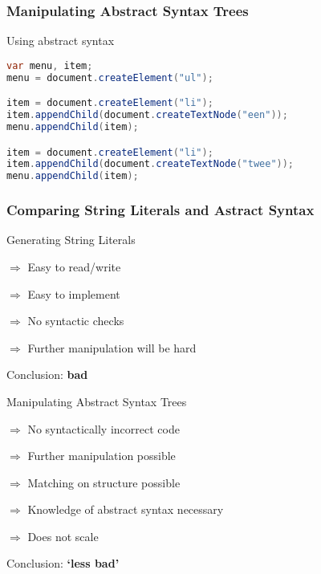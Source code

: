 \documentclass{beamer}
\begin{document}
\begin{frame}[fragile]

  \frametitle{Manipulating Abstract Syntax Trees}

  \begin{block}{Using abstract syntax}
    \begin{lstlisting}[language=Java]
var menu, item;
menu = document.createElement("ul");

item = document.createElement("li");
item.appendChild(document.createTextNode("een"));
menu.appendChild(item);

item = document.createElement("li");
item.appendChild(document.createTextNode("twee"));
menu.appendChild(item);
    \end{lstlisting}
  \end{block}

\end{frame}


\begin{frame}

  \frametitle{Comparing String Literals and Astract Syntax}

  \begin{block}{Generating String Literals}
    \begin{description}
      \item{\color{darkgreen}$\Rightarrow$} Easy to read/write
      \item{\color{darkgreen}$\Rightarrow$} Easy to implement
      \item{\color{darkred}$\Rightarrow$} No syntactic checks
      \item{\color{darkred}$\Rightarrow$} Further manipulation will be hard
    \end{description}
    Conclusion: {\bf bad}
  \end{block}

  \begin{block}{Manipulating Abstract Syntax Trees}
    \begin{description}
      \item{\color{darkgreen}$\Rightarrow$} No syntactically incorrect code
      \item{\color{darkgreen}$\Rightarrow$} Further manipulation possible
      \item{\color{darkgreen}$\Rightarrow$} Matching on structure possible
      \item{\color{darkred}$\Rightarrow$} Knowledge of abstract syntax necessary
      \item{\color{darkred}$\Rightarrow$} Does not scale
    \end{description}
    Conclusion: {\bf `less bad'}
  \end{block}

\end{frame}
\end{document}
